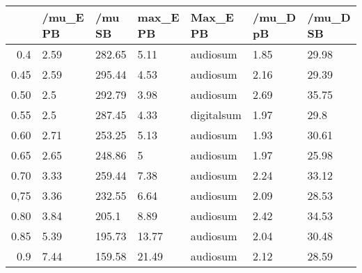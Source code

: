 \begin{table}[ht]
\centering
\begin{tabular}{rllllll}
  \hline
 & /mu\_E PB & /mu SB & max\_E PB & Max\_E PB & /mu\_D pB & /mu\_D SB \\ 
  \hline
0.4 & 2.59 & 282.65 & 5.11 & audiosum & 1.85 & 29.98 \\ 
  0.45 & 2.59 & 295.44 & 4.53 & audiosum & 2.16 & 29.39 \\ 
  0.50 & 2.5 & 292.79 & 3.98 & audiosum & 2.69 & 35.75 \\ 
  0.55 & 2.5 & 287.45 & 4.33 & digitalsum & 1.97 & 29.8 \\ 
  0.60 & 2.71 & 253.25 & 5.13 & audiosum & 1.93 & 30.61 \\ 
  0.65 & 2.65 & 248.86 & 5 & audiosum & 1.97 & 25.98 \\ 
  0.70 & 3.33 & 259.44 & 7.38 & audiosum & 2.24 & 33.12 \\ 
  0,75 & 3.36 & 232.55 & 6.64 & audiosum & 2.09 & 28.53 \\ 
  0.80 & 3.84 & 205.1 & 8.89 & audiosum & 2.42 & 34.53 \\ 
  0.85 & 5.39 & 195.73 & 13.77 & audiosum & 2.04 & 30.48 \\ 
  0.9 & 7.44 & 159.58 & 21.49 & audiosum & 2.12 & 28.59 \\ 
   \hline
\end{tabular}
\end{table}
